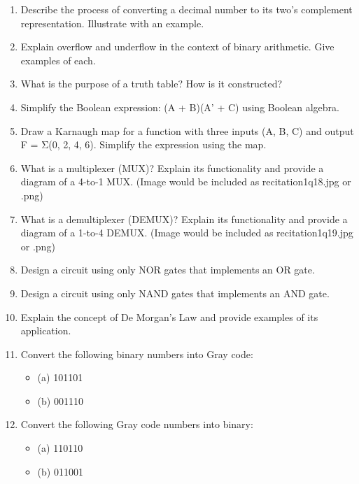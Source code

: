 \documentclass{article}
\begin{document}
\begin{enumerate}
    \item  Describe the process of converting a decimal number to its two's complement representation.  Illustrate with an example.

    \item  Explain overflow and underflow in the context of binary arithmetic.  Give examples of each.

    \item  What is the purpose of a truth table? How is it constructed?

    \item  Simplify the Boolean expression:  (A + B)(A' + C) using Boolean algebra.

    \item  Draw a Karnaugh map for a function with three inputs (A, B, C) and output F = Σ(0, 2, 4, 6).  Simplify the expression using the map.

    \item  What is a multiplexer (MUX)?  Explain its functionality and provide a diagram of a 4-to-1 MUX. (Image would be included as recitation1q18.jpg or .png)


    \item  What is a demultiplexer (DEMUX)? Explain its functionality and provide a diagram of a 1-to-4 DEMUX. (Image would be included as recitation1q19.jpg or .png)

    \item  Design a circuit using only NOR gates that implements an OR gate.


    \item  Design a circuit using only NAND gates that implements an AND gate.


    \item  Explain the concept of De Morgan's Law and provide examples of its application.


    \item  Convert the following binary numbers into Gray code:
    \begin{itemize}
        \item (a) 101101
        \item (b) 001110
    \end{itemize}

    \item Convert the following Gray code numbers into binary:
    \begin{itemize}
        \item (a) 110110
        \item (b) 011001
    \end{itemize}


\end{enumerate}
\end{document}
